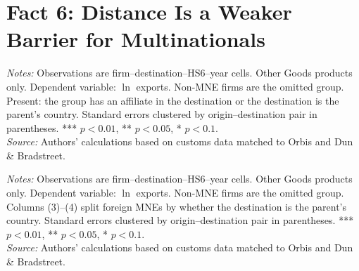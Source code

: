 \documentclass[11pt,a4paper]{article}
\begin{document}
\section{Fact 6: Distance Is a Weaker Barrier for Multinationals}\label{sec:f6_rest}
\begin{table}[H]\centering\small%
  \caption{Other Goods: Distance and Firm Exports: Multinationals by Presence at the Destination}%
  \label{tab:t2_rest}%
  \par\vspace{3pt}%
  \begin{minipage}{0.95\textwidth}\footnotesize %
  \textit{Notes:} Observations are firm--destination--HS6--year cells. Other Goods products only. Dependent variable: $\ln$ exports. Non-MNE firms are the omitted group. Present: the group has an affiliate in the destination or the destination is the parent's country. Standard errors clustered by origin--destination pair in parentheses. *** $p<0.01$, ** $p<0.05$, * $p<0.1$.\\[3pt]%
  \textit{Source:} Authors' calculations based on customs data matched to Orbis and Dun \& Bradstreet.%
  \end{minipage}%
  \end{table}
\begin{table}[H]\centering\small%
  \caption{Other Goods: Distance and Firm Exports: Foreign and Domestic Multinationals}%
  \label{tab:dist_rest}%
  \par\vspace{3pt}%
  \begin{minipage}{0.95\textwidth}\footnotesize %
  \textit{Notes:} Observations are firm--destination--HS6--year cells. Other Goods products only. Dependent variable: $\ln$ exports. Non-MNE firms are the omitted group. Columns (3)--(4) split foreign MNEs by whether the destination is the parent's country. Standard errors clustered by origin--destination pair in parentheses. *** $p<0.01$, ** $p<0.05$, * $p<0.1$.\\[3pt]%
  \textit{Source:} Authors' calculations based on customs data matched to Orbis and Dun \& Bradstreet.%
  \end{minipage}%
  \end{table}
\end{document}
